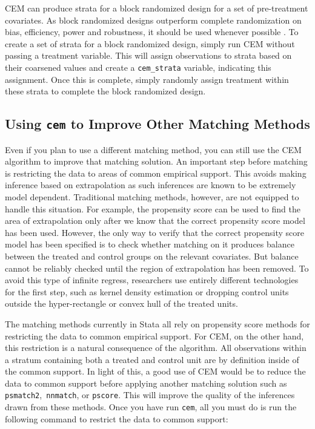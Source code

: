 \documentclass[11pt]{article}
\begin{document}
CEM can produce strata for a block randomized design for a set of
pre-treatment covariates. As block randomized designs outperform complete
randomization on bias, efficiency, power and robustness, it should be used
whenever possible \citep{ImaKinNal09,ImaKinStu08}. To create a set of
strata for a block randomized design, simply run CEM without passing a
treatment variable. This will assign observations to strata based on their
coarsened values and create a \texttt{cem\_strata} variable, indicating
this assignment. Once this is complete, simply randomly assign treatment
within these strata to complete the block randomized design.

\subsection{Using \texttt{cem} to Improve Other Matching Methods}

Even if you plan to use a different matching method, you can still use the
CEM algorithm to improve that matching solution. An important step before
matching is restricting the data to areas of common empirical support.
This avoids making inference based on extrapolation as such inferences are
known to be extremely model dependent. Traditional matching methods, however,
are not equipped to handle this situation. For example, the propensity
score can be used to find the area of extrapolation only after we know
that the correct propensity score model has been used.  However, the only
way to verify that the correct propensity score model has been specified
is to check whether matching on it produces balance between the treated
and control groups on the relevant covariates.  But balance cannot be
reliably checked until the region of extrapolation has been removed.  To
avoid this type of infinite regress, researchers use entirely different
technologies for the first step, such as kernel density estimation
\citep{HecIchTod98} or dropping control units outside the hyper-rectangle
\citep{IacPor08} or convex hull \citep{KinZen06} of the treated units.

The matching methods currently in Stata all rely on propensity score
methods for restricting the data to common empirical support. For CEM, on
the other hand, this restriction is a natural consequence of the
algorithm. All observations within a stratum containing both a treated and
control unit are by definition inside of the common support. In light of
this, a good use of CEM would be to reduce the data to common support
before applying another matching solution such as
\texttt{psmatch2},\texttt{ nnmatch}, or \texttt{pscore}. This will improve
the quality of the inferences drawn from these methods. Once you have run
\texttt{cem}, all you must do is run the following command to restrict the
data to common support:
\end{document}
